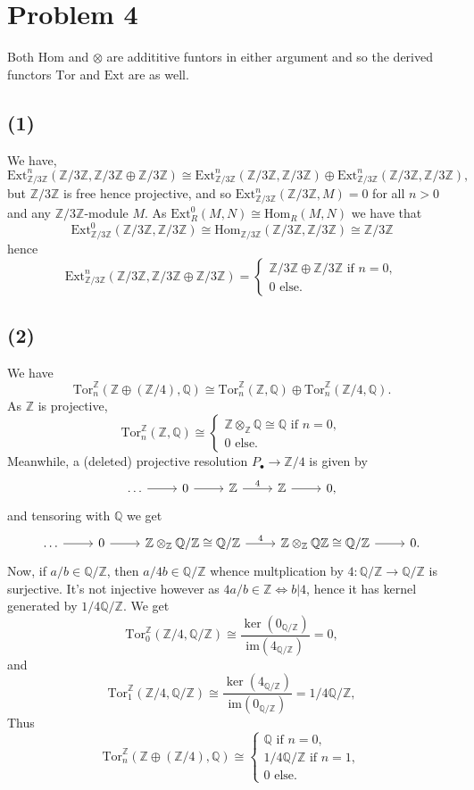 \documentclass{article}
\theoremstyle{definition}
\newcommand{\Z}{\mathbb{Z}}
\newcommand{\Q}{\mathbb{Q}}
\newcommand{\Hom}{\text{Hom}}
\newcommand{\im}{\text{im}}
\newcommand{\Tor}{\text{Tor}}
\newcommand{\Ext}{\text{Ext}}
\begin{document}
\section*{Problem 4}

Both $\Hom$ and $\otimes$ are addititive funtors in either argument and so the
derived functors $\Tor$ and $\Ext$ are as well.

\subsection*{(1)}
We have, 
\[
	\Ext^{n}_{\Z/3\Z}(\Z/3\Z, \Z/3\Z \oplus \Z/3\Z)
	\cong
	\Ext^{n}_{\Z/3\Z}(\Z/3\Z, \Z/3\Z)
	\oplus
	\Ext^{n}_{\Z/3\Z}(\Z/3\Z, \Z/3\Z),
\] 
but $\Z/3\Z$ is free hence projective, and so $\Ext^{n}_{\Z/3\Z}(\Z/3\Z, M) =
0$ for all $n > 0$ and any $\Z/3\Z$-module $M$. As $\Ext^{0}_{R}(M, N) \cong \Hom_{R}(M, N)$
we have that 
\[
	\Ext^{0}_{\Z/3\Z}(\Z/3\Z, \Z/3\Z)
	\cong
	\Hom_{\Z/3\Z}(\Z/3\Z, \Z/3\Z)
	\cong
	\Z/3\Z
\]
hence
\[
	\Ext^{n}_{\Z/3\Z}(\Z/3\Z, \Z/3\Z \oplus \Z/3\Z)
	=
	\begin{cases}
		\Z/3\Z \oplus \Z/3\Z \text{ if } n = 0, \\	
		0 \text{ else.}
	\end{cases}
\] 

\subsection*{(2)}

We have
\[
	\Tor_{n}^{\Z}(\Z \oplus (\Z/4), \Q)
	\cong
	\Tor_{n}^{\Z}(\Z, \Q)
	\oplus
	\Tor_{n}^{\Z}(\Z/4, \Q).
\] 
As $\Z$ is projective,
\[
	\Tor_{n}^{\Z}(\Z, \Q)
	\cong
	\begin{cases}
		\Z \otimes_{\Z} \Q \cong \Q \text{ if } n = 0, \\	
		0 \text{ else.}
	\end{cases}
\] 
Meanwhile, a (deleted) projective resolution $P_{\bullet} \to \Z/4$
is given by
\[
\begin{tikzcd}
	\ldots
	\ar{r}
	& 0
	\ar{r}
	& \Z
	\ar{r}{4}
	& \Z
	\ar{r}
	& 0,
\end{tikzcd}
\] 
and tensoring with $\Q$ we get
\[
\begin{tikzcd}
	\ldots
	\ar{r}
	& 0
	\ar{r}
	& \Z \otimes_{\Z} \Q/\Z \cong \Q/\Z
	\ar{r}{4}
	& \Z \otimes_{\Z} \Q\Z \cong \Q/\Z
	\ar{r}
	& 0.
\end{tikzcd}
\]
Now, if $a/b \in \Q/\Z$, then $a/4b \in \Q/\Z$ whence multplication by $4 :
\Q/\Z \to \Q/\Z$ is surjective. It's not injective however as $4a/b \in \Z
\Leftrightarrow b | 4$, hence it has kernel generated by $1/4\Q/\Z$. We get
\[
	\Tor_{0}^{\Z}(\Z/4, \Q/\Z) \cong \frac{\ker(0_{\Q/\Z})}{\im(4_{\Q/\Z})} = 0,
\] 
and
\[
	\Tor_{1}^{\Z}(\Z/4, \Q/\Z) \cong \frac{\ker(4_{\Q/\Z})}{\im(0_{\Q/\Z})} = 1/4\Q/\Z,
\]
Thus
\[
	\Tor_{n}^{\Z}(\Z \oplus (\Z/4), \Q)
	\cong
	\begin{cases}
		\Q \text{ if } n = 0, \\
		1/4\Q/\Z \text{ if } n = 1, \\
		0 \text{ else.}
	\end{cases}
\] 
\end{document}
